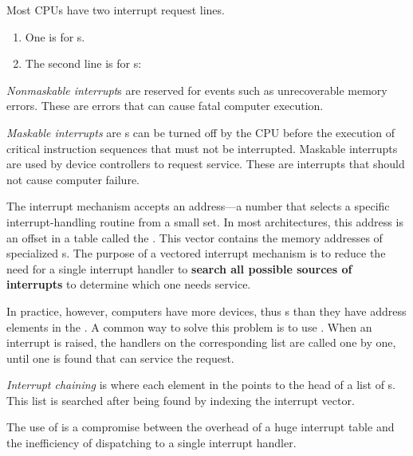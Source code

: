 Most CPUs have two interrupt request lines.
\begin{enumerate}[noitemsep]
\item One is for s.
\item The second line is for s:
\end{enumerate}

\begin{definition}\label{def:Nonmaskable_Interrupt}
  \emph{Nonmaskable interrupt}s are reserved for events such as unrecoverable memory errors.
  These are errors that can cause fatal computer execution.
\end{definition}

\begin{definition}\label{def:Maskable_Interrupt}
  \emph{Maskable interrupts} are s can be turned off by the CPU before the execution of critical instruction sequences that must not be interrupted.
  Maskable interrupts are used by device controllers to request service.
  These are interrupts that should not cause computer failure.
\end{definition}

The interrupt mechanism accepts an address—a number that selects a specific interrupt-handling routine from a small set.
In most architectures, this address is an offset in a table called the .
This vector contains the memory addresses of specialized s.
The purpose of a vectored interrupt mechanism is to reduce the need for a single interrupt handler to \textbf{search all possible sources of interrupts} to determine which one needs service.

In practice, however, computers have more devices, thus s than they have address elements in the .
A common way to solve this problem is to use .
When an interrupt is raised, the handlers on the corresponding list are called one by one, until one is found that can service the request.

\begin{definition}\label{def:Interrupt_Chaining}
  \emph{Interrupt chaining} is where each element in the  points to the head of a list of s.
  This list is searched after being found by indexing the interrupt vector.

  \begin{remark}
    The use of  is a compromise between the overhead of a huge interrupt table and the inefficiency of dispatching to a single interrupt handler.
  \end{remark}
\end{definition}


